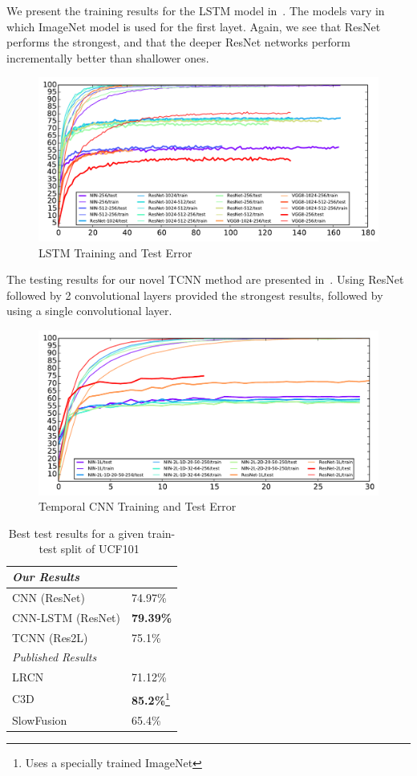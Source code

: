 We present the training results for the LSTM model in~. The models vary in which ImageNet model is used for the first layet. Again, we see that ResNet performs the strongest, and that the deeper ResNet networks perform incrementally better than shallower ones. 
\begin{figure}
  \centering
  \includegraphics[width=1.0\linewidth]{figs/RNNout}
  \caption{LSTM Training and Test Error}
  \label{fig:lstmtest}
\end{figure}

The testing results for our novel TCNN method are presented in~. Using ResNet followed by 2 convolutional layers provided the strongest results, followed by using a single convolutional layer. 
\begin{figure}
  \centering
  \includegraphics[width=1.0\linewidth]{figs/TCNNout}
  \caption{Temporal CNN Training and Test Error}
  \label{fig:tnntest}
\end{figure}

\begin{table}[h!]
 \caption{Best test results for a given train-test split of UCF101~\cite{ucf101}}
\centering
 \begin{tabular}{||l l||}
 \hline
 \textit{Our Results} & \\ \hline
 CNN (ResNet) & 74.97\% \\
 CNN-LSTM (ResNet) & \textbf{79.39\%} \\
 TCNN (Res2L) & 75.1\% \\ \hline
 \textit{Published Results} & \\ \hline
 LRCN~\cite{byeon2015scene} & 71.12\% \\
 C3D~\cite{stf} & \textbf{85.2\%}\footnote{Uses a specially trained ImageNet} \\
 SlowFusion~\cite{cnnvid} & 65.4\%\\ [0.5ex]
 \hline
 \end{tabular}
\end{table}


